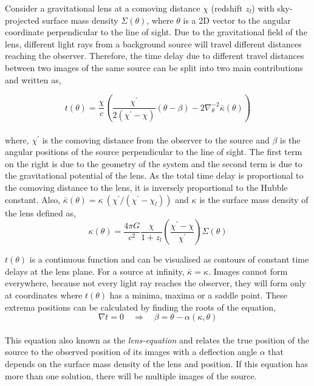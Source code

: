 Consider a gravitational lens at a comoving distance $\chi$ (redshift $z_l$) 
with sky-projected surface
mass density $\Sigma(\theta)$, where $\theta$ is a 2D vector to the
angular coordinate perpendicular to the line of sight. Due to the 
gravitational field of the lens, different light rays from a background source
will travel different distances reaching the observer. Therefore, the time delay
due to different travel distances between two images of the same source can be
split into two main contributions and written as,

\begin{equation}
	t(\theta) = \dfrac{\chi}{c} \left( \dfrac{\chi^{\prime}}{2(\chi^{\prime}-\chi)} 
				(\theta-\beta) 
				- 2\nabla_{\theta}^{-2} \bar{\kappa}(\theta) \right)
	\label{eqn:timedelay}
\end{equation}
\\
where, $\chi^{\prime}$ is the comoving distance from the observer
to the source and $\beta$ is 
the angular positions of the source perpendicular to the line of sight.
The first term on the right is due to the geometry of the system
and the second term is due to the gravitational potential of the lens.
As the total time delay is proportional to the comoving distance
to the lens, it is inversely proportional to the Hubble constant. 
Also, $\bar{\kappa}(\theta) = \kappa\ (\chi^{\prime}/(\chi^{\prime}-\chi_l))$ and
$\kappa$ is the surface mass density of the lens defined as,
\begin{equation}
	\kappa(\theta) = \dfrac{4\pi G}{c^2} \dfrac{\chi}{1+z_l}
					  \left(\dfrac{\chi^{\prime}-\chi}{\chi^{\prime}}\right) \Sigma(\theta)
\end{equation}

$t(\theta)$ is a continuous function and can be visualised as contours
of constant time delays at the lens plane. For a source at infinity,
$\bar{\kappa}=\kappa$.
Images cannot form everywhere, because not every light
ray reaches the observer, they will form only at coordinates where $t(\theta)$
has a minima, maxima or a saddle point. These extrema positions can 
be calculated by finding the roots of the equation,
\begin{equation}
	\nabla t = 0 \quad \Rightarrow \quad \beta = \theta - \alpha(\kappa,\theta)
\end{equation}
\\
This equation also known as the {\it lens-equation} and relates the true 
position of the source to the observed position of its images with
a deflection angle $\alpha$ that depends on the surface mass density
of the lens and position. If this equation has more than one solution,
there will be multiple images of the source.

